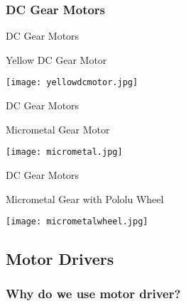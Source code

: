 \documentclass{beamer}
\begin{document}
	\subsubsection{DC Gear Motors}
	
	\begin{frame}{DC Gear Motors}
	
		
		\begin{alertblock}{Yellow DC Gear Motor}
			
			\texttt{[image: yellowdcmotor.jpg]}
		
		\end{alertblock}
		
	
	\end{frame}
	
	
	\begin{frame}{DC Gear Motors}
	
		\begin{alertblock}{Micrometal Gear Motor}
	
			\texttt{[image: micrometal.jpg]}
			
		\end{alertblock}
	
	\end{frame}
	
	\begin{frame}{DC Gear Motors}
	
		\begin{alertblock}{Micrometal Gear with Pololu Wheel}
			
			\texttt{[image: micrometalwheel.jpg]}			
			
		\end{alertblock}
	
	\end{frame}
	
	\subsection{Motor Drivers}
	
	\subsubsection{Why do we use motor driver?}
	
\end{document}
